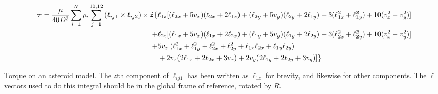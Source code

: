\documentclass[aps,twocolumn,secnumarabic,balancelastpage,amsmath,amssymb,nofootinbib,floatfix]{revtex4-1}
\begin{document}
\begin{table*} 
    \begin{equation}
        \begin{aligned}
        \bm \tau = \frac{\mu}{40D^3}\sum_{i=1}^N\rho_i \sum_{j=1}^{10, 12} \left( \bm\ell_{ij1} \times \bm\ell_{ij2} \right) \times \hat {\bm z} \{
        &\ell_{1z} [(\ell_{2x} + 5v_x)(\ell_{2x} + 2\ell_{1x}) + (\ell_{2y} + 5 v_y)(\ell_{2y}+2\ell_{1y}) + 3 (\ell_{1x}^2 + \ell_{1y}^2) + 10(v_x^2 + v_y^2)]\\
        + &\ell_{2z} [ (\ell_{1x}+5v_x)(\ell_{1x}+2\ell_{2x}) + (\ell_{1y}+5v_y)(\ell_{1y}+2\ell_{2y}) + 3 (\ell_{2x}^2 + \ell_{2y}^2) + 10(v_x^2 + v_y^2)]\\
        + &5v_z [(\ell_{1x}^2 + \ell_{1y}^2 + \ell_{2x}^2 + \ell_{2y}^2 + \ell_{1x} \ell_{2x} + \ell_{1y} \ell_{2y}) \\
        & + 2v_x(2\ell_{1x} + 2\ell_{2x} + 3 v_x) + 2v_y(2\ell_{1y} + 2\ell_{2y} + 3 v_y)]\}
        \end{aligned}
    \label{eqn:analytical-torque}
    \end{equation}
    \caption*{Torque on an asteroid model. The $z$th component of $\bm \ell_{ij1}$ has been written as $\ell_{1z}$ for brevity, and likewise for other components. The $\bm \ell$ vectors used to do this integral should be in the global frame of reference, rotated by $R$.}
\end{table*}




\end{document}
